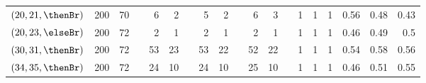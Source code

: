 \begin{table}
\begin{tabular}{l|rrr|rrr|rrr|rrr|rrrrrr}
    $(20,21,\thenBr)$  & 200  & 70   &                   & 6   & 2    &                    & 5   & 2  &                        & 6   & 3   & & 1 & 1 & 1 & 0.56 & 0.48 & 0.43 \\
    $(20,23,\elseBr)$  & 200  & 72   &                   & 2   & 1    &                    & 2   & 1  &                        & 2   & 1   & & 1 & 1 & 1 & 0.46 & 0.49 & 0.5 \\
    $(30,31,\thenBr)$  & 200  & 72   &                   & 53  & 23   &                    & 53  & 22 &                        & 52  & 22  & & 1 & 1 & 1 & 0.54 & 0.58 & 0.56 \\
    $(34,35,\thenBr)$  & 200  & 72   &                   & 24  & 10   &                    & 24  & 10 &                        & 25  & 10  &  & 1 & 1 & 1 & 0.46 & 0.51 & 0.55 \\
    \bottomrule
    \end{tabular}
\end{table}
